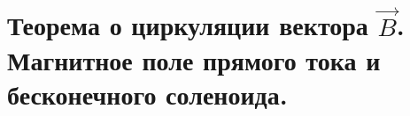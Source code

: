 \section{Теорема о циркуляции вектора $\vec{B}$. Магнитное поле прямого тока и бесконечного соленоида.}